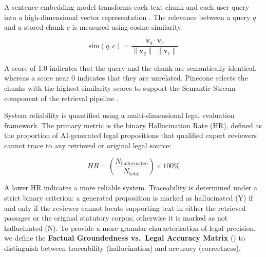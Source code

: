 A sentence-embedding model transforms each text chunk and each user query into a
high-dimensional vector representation \cite{r602}. The relevance between a query $q$
and a stored chunk $c$ is measured using cosine similarity:

\begin{equation}
  \mathrm{sim}(q, c) = \frac{\mathbf{v}_{q} \cdot \mathbf{v}_{c}}
                            {\|\mathbf{v}_{q}\|\;\|\mathbf{v}_{c}\|}
  \label{eq:cosine}
\end{equation}

A score of 1.0 indicates that the query and the chunk are semantically identical,
whereas a score near 0 indicates that they are unrelated. Pinecone selects the chunks
with the highest similarity scores to support the Semantic Stream component of the
retrieval pipeline \cite{r603}.

System reliability is quantified using a multi-dimensional legal evaluation framework.
The primary metric is the binary Hallucination Rate (HR), defined as the proportion of
AI-generated legal propositions that qualified expert reviewers cannot trace to any
retrieved or original legal source:

\begin{equation}
  HR = \left( \frac{N_{\text{hallucinated}}}{N_{\text{total}}} \right) \times 100\%
  \label{eq:hr}
\end{equation}

A lower HR indicates a more reliable system. Traceability is determined under a strict
binary criterion: a generated proposition is marked as hallucinated (Y) if and only if
the reviewer cannot locate supporting text in either the retrieved passages or the
original statutory corpus; otherwise it is marked as not hallucinated (N). To provide
a more granular characterisation of legal precision, we define the \textbf{Factual Groundedness vs.\ Legal Accuracy Matrix} () to distinguish between traceability (hallucination) and accuracy (correctness).

